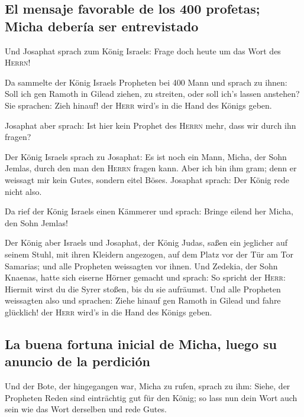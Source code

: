 \hypertarget{el-mensaje-favorable-de-los-400-profetas-micha-deberuxeda-ser-entrevistado}{%
\subsection{El mensaje favorable de los 400 profetas; Micha debería ser
entrevistado}\label{el-mensaje-favorable-de-los-400-profetas-micha-deberuxeda-ser-entrevistado}}

 Und Josaphat sprach zum König Israels: Frage doch heute
um das Wort des \textsc{Herrn}!

 Da sammelte der König Israels Propheten bei 400 Mann und
sprach zu ihnen: Soll ich gen Ramoth in Gilead ziehen, zu streiten, oder
soll ich's lassen anstehen? Sie sprachen: Zieh hinauf! der \textsc{Herr}
wird's in die Hand des Königs geben.

 Josaphat aber sprach: Ist hier kein Prophet des
\textsc{Herrn} mehr, dass wir durch ihn fragen?

 Der König Israels sprach zu Josaphat: Es ist noch ein
Mann, Micha, der Sohn Jemlas, durch den man den \textsc{Herrn} fragen
kann. Aber ich bin ihm gram; denn er weissagt mir kein Gutes, sondern
eitel Böses. Josaphat sprach: Der König rede nicht also.

 Da rief der König Israels einen Kämmerer und sprach:
Bringe eilend her Micha, den Sohn Jemlas!

 Der König aber Israels und Josaphat, der König Judas,
saßen ein jeglicher auf seinem Stuhl, mit ihren Kleidern angezogen, auf
dem Platz vor der Tür am Tor Samarias; und alle Propheten weissagten vor
ihnen.  Und Zedekia, der Sohn Knaenas, hatte sich eiserne
Hörner gemacht und sprach: So spricht der \textsc{Herr}: Hiermit wirst
du die Syrer stoßen, bis du sie aufräumst.  Und alle
Propheten weissagten also und sprachen: Ziehe hinauf gen Ramoth in
Gilead und fahre glücklich! der \textsc{Herr} wird's in die Hand des
Königs geben.

\hypertarget{la-buena-fortuna-inicial-de-micha-luego-su-anuncio-de-la-perdiciuxf3n}{%
\subsection{La buena fortuna inicial de Micha, luego su anuncio de la
perdición}\label{la-buena-fortuna-inicial-de-micha-luego-su-anuncio-de-la-perdiciuxf3n}}

 Und der Bote, der hingegangen war, Micha zu rufen,
sprach zu ihm: Siehe, der Propheten Reden sind einträchtig gut für den
König; so lass nun dein Wort auch sein wie das Wort derselben und rede
Gutes.

